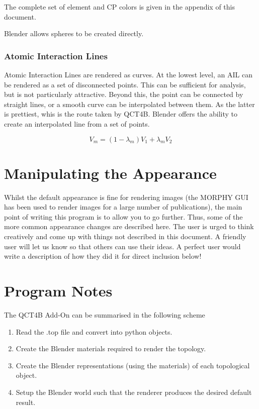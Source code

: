\documentclass{report}
\begin{document}
The complete set of element and CP colors is given in the appendix of this document.

Blender allows spheres to be created directly.

\subsection{Atomic Interaction Lines}

Atomic Interaction Lines are rendered as curves.
At the lowest level, an AIL can be rendered as a set of disconnected points.
This can be sufficient for analysis, but is not particularly attractive.
Beyond this, the point can be connected by straight lines, or a smooth curve can be interpolated between them.
As the latter is prettiest, whis is the route taken by QCT4B.
Blender offers the ability to create an interpolated line from a set of points.

\begin{equation}
V_{m} = (1 - \lambda_{m}) V_{1} + \lambda_{m} V_{2}
\end{equation}

\chapter{Manipulating the Appearance}

Whilst the default appearance is fine for rendering images (the MORPHY GUI has been used to render images for a large number of publications), the main point of writing this program is to allow you to go further.
Thus, some of the more common appearance changes are described here. 
The user is urged to think creatively and come up with things not described in this document.
A friendly user will let us know so that others can use their ideas.
A perfect user would write a description of how they did it for direct inclusion below!

\chapter{Program Notes}

The QCT4B Add-On can be summarised in the following scheme

\begin{enumerate}

  \item Read the .top file and convert into python objects.
  \item Create the Blender materials required to render the topology.
  \item Create the Blender representations (using the materials) of each topological object.
  \item Setup the Blender world such that the renderer produces the desired default result.

\end{enumerate}
\end{document}
